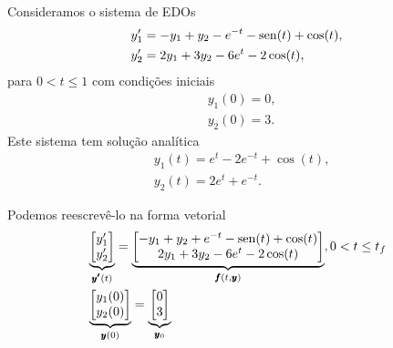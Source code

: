 \begin{ex}\label{cap_pvi_sec_euler:ex:sis}
  Consideramos o sistema de EDOs
  \begin{subequations}
    \begin{align}
      &y_1' = -y_1 + y_2 - e^{-t} - \operatorname{sen}(t) + \cos(t),\\
      &y_2' = 2y_1 + 3y_2 - 6e^{t} - 2\cos(t),
    \end{align}
  \end{subequations}
  para $0 < t \leq 1$ com condições iniciais
  \begin{subequations}
    \begin{align}
      &y_1(0) = 0,\\
      &y_2(0) = 3.
    \end{align}
  \end{subequations}
  Este sistema tem solução analítica
  \begin{subequations}
    \begin{align}
      &y_1(t) = e^t - 2e^{-t} + \cos(t),\\
      &y_2(t) = 2e^t + e^{-t}.
    \end{align}
  \end{subequations}
  
  Podemos reescrevê-lo na forma vetorial
  \begin{subequations}
    \begin{align}
      &\underbrace{\begin{bmatrix}
        y_1'\\
        y_2'
      \end{bmatrix}}_{\pmb{y'}(t)} =
      \underbrace{\begin{bmatrix}
        -y_1 + y_2 + e^{-t} - \operatorname{sen}(t) + \cos(t)\\
        2y_1 + 3y_2 - 6e^{t} - 2\cos(t)
      \end{bmatrix}}_{\pmb{f}(t, \pmb{y})}, 0 < t \leq t_f\\
      &\underbrace{\begin{bmatrix}
        y_1(0)\\
        y_2(0)
      \end{bmatrix}}_{\pmb{y}(0)} =
      \underbrace{\begin{bmatrix}
        0\\
        3
      \end{bmatrix}}_{\pmb{y}_0}
    \end{align}
  \end{subequations}


\end{ex}
